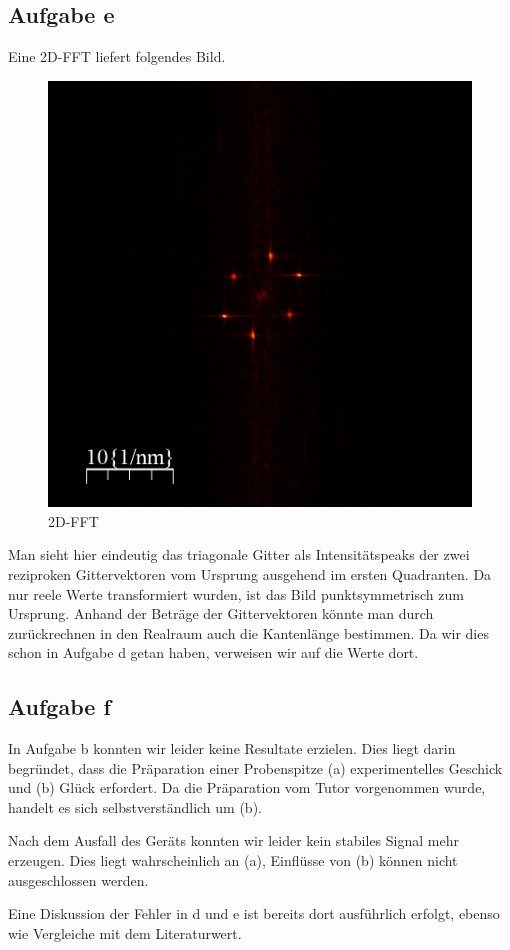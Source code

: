 \documentclass[a4paper,german,12pt,smallheadings]{scrartcl}
\begin{document}
\subsection{Aufgabe e}

Eine 2D-FFT liefert folgendes Bild.

\begin{figure}[h!]
  \centering
  \includegraphics[width=0.5 \textwidth]{fft.png}
  \caption{2D-FFT}
\end{figure}

Man sieht hier eindeutig das triagonale Gitter als Intensitätspeaks der zwei
reziproken Gittervektoren vom Ursprung ausgehend im ersten Quadranten. Da nur
reele Werte transformiert wurden, ist das Bild punktsymmetrisch zum Ursprung.
Anhand der Beträge der Gittervektoren könnte man durch zurückrechnen in den
Realraum auch die Kantenlänge bestimmen. Da wir dies schon in Aufgabe d getan
haben, verweisen wir auf die Werte dort.

\subsection{Aufgabe f}

In Aufgabe b konnten wir leider keine Resultate erzielen. Dies liegt darin
begründet, dass die Präparation einer Probenspitze (a) experimentelles Geschick und
(b) Glück erfordert. Da die Präparation vom Tutor vorgenommen wurde, handelt es
sich selbstverständlich um (b).

Nach dem Ausfall des Geräts konnten wir leider kein stabiles Signal mehr
erzeugen. Dies liegt wahrscheinlich an (a), Einflüsse von (b) können nicht
ausgeschlossen werden.

Eine Diskussion der Fehler in d und e ist bereits dort ausführlich erfolgt,
ebenso wie Vergleiche mit dem Literaturwert.






\end{document}
